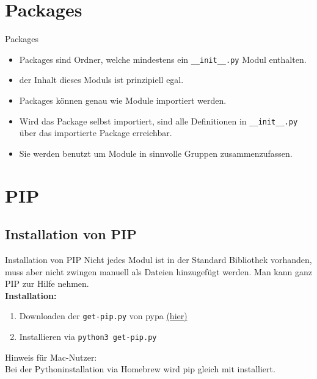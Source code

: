 \section{Packages}
\begin{frame}{Packages}
	\begin{itemize}
		\item Packages sind Ordner, welche mindestens ein \texttt{\_\_init\_\_.py} Modul enthalten.
		\item der Inhalt dieses Moduls ist prinzipiell egal.
		\item Packages können genau wie Module importiert werden.
		\item Wird das Package selbst importiert, sind alle Definitionen in \texttt{\_\_init\_\_.py} über das importierte Package erreichbar.
		\item Sie werden benutzt um Module in sinnvolle Gruppen zusammenzufassen.
	\end{itemize}
\end{frame}


\section{PIP}
\subsection{Installation von PIP}
\begin{frame}{Installation von PIP}
	Nicht jedes Modul ist in der Standard Bibliothek vorhanden, muss aber nicht zwingen manuell als Dateien hinzugefügt werden. Man kann ganz PIP zur Hilfe nehmen.\\[.5cm]
	\textbf{Installation:}\\
	\begin{enumerate}
		\item Downloaden der \texttt{get-pip.py} von pypa \href{https://bootstrap.pypa.io/get-pip.py}{(hier)}
		\item Installieren via \texttt{python3 get-pip.py}\\[.5cm]
	\end{enumerate}

	Hinweis für Mac-Nutzer:\\
	Bei der Pythoninstallation via Homebrew wird pip gleich mit installiert.
\end{frame}

